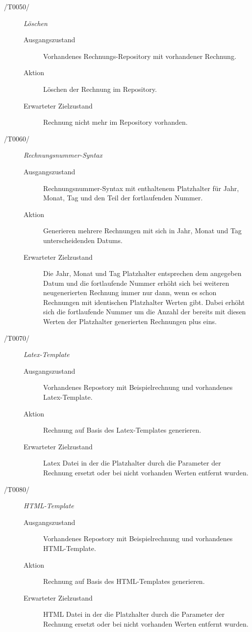 \begin{description}
  \item[/T0050/]
	\textit{Löschen}
	\begin{description}
		\item[Ausgangszustand]
		Vorhandenes Rechnungs-Repository mit vorhandener Rechnung.
		\item[Aktion]
		Löschen der Rechnung im Repository.
		\item[Erwarteter Zielzustand]
		Rechnung nicht mehr im Repository vorhanden.
	\end{description}

  \item[/T0060/]
	\textit{Rechnungsnummer-Syntax}
	\begin{description}
		\item[Ausgangszustand]
		Rechnungsnummer-Syntax mit enthaltenem Platzhalter für Jahr, Monat, Tag und den Teil der fortlaufenden Nummer.
		\item[Aktion]
		Generieren mehrere Rechnungen mit sich in Jahr, Monat und Tag unterscheidenden Datums.
		\item[Erwarteter Zielzustand]
		Die Jahr, Monat und Tag Platzhalter entsprechen dem angegeben Datum und die fortlaufende Nummer erhöht sich bei weiteren neugenerierten Rechnung immer nur dann, wenn es schon Rechnungen mit identischen Platzhalter Werten gibt. Dabei erhöht sich die fortlaufende Nummer um die Anzahl der bereits mit diesen Werten der Platzhalter generierten Rechnungen plus eins.
	\end{description}

  \item[/T0070/]
	\textit{Latex-Template}
	\begin{description}
		\item[Ausgangszustand]
		Vorhandenes Repostory mit Beispielrechnung und vorhandenes Latex-Template.
		\item[Aktion]
		Rechnung auf Basis des Latex-Templates generieren.
		\item[Erwarteter Zielzustand]
		Latex Datei in der die Platzhalter durch die Parameter der Rechnung ersetzt oder bei nicht vorhanden Werten entfernt wurden.
	\end{description}

  \item[/T0080/]
	\textit{HTML-Template}
	\begin{description}
		\item[Ausgangszustand]
		Vorhandenes Repostory mit Beispielrechnung und vorhandenes HTML-Template.
		\item[Aktion]
		Rechnung auf Basis des HTML-Templates generieren.
		\item[Erwarteter Zielzustand]
		HTML Datei in der die Platzhalter durch die Parameter der Rechnung ersetzt oder bei nicht vorhanden Werten entfernt wurden.
	\end{description}
\end{description}